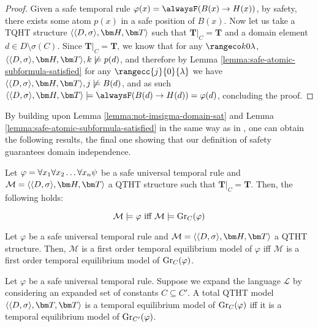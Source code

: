 \begin{proof}
  Given a safe temporal rule
  $\varphi(x) = \alwaysF(B(x) \rightarrow H(x))$, by safety, there
  exists some atom $p(x)$ in a safe position of $B(x)$. Now let us
  take a TQHT structure $\qthandt$ such that $\bm{T}\vert_{C}=\bm{T}$
  and a domain element $d \in D \setminus \sigma(C)$. Since
  $\bm{T}\vert_{C}=\bm{T}$, we know that for any $\kinlambda$,
  $\qthandt, k \not \models p(d)$, and therefore by Lemma
  \ref{lemma:safe-atomic-subformula-satisfied} for any
  $\rangecc{j}{0}{\lambda}$ we have $\qthandt,j \not \models B(d)$,
  and as such
  $\qthandt \models \alwaysF(B(d) \rightarrow H(d)) = \varphi(d)$,
  concluding the proof.
\end{proof}

By building upon Lemma \ref{lemma:not-imsigma-domain-sat} and Lemma
\ref{lemma:safe-atomic-subformula-satisfied} in the same way as in
\cite{agcapevidi17a}, one can obtain the following results, the final
one showing that our definition of safety guarantees domain independence.

\begin{proposition}\label{prop:sat-iff-sat-groundc}
  Let $\varphi = \forall x_1 \forall x_2 \dots \forall x_n \psi$ be a safe universal temporal rule and \\
  $\mathcal{M} = \qthandt$ a QTHT structure such that
  $\bm{T}\vert_{C}=\bm{T}$. Then, the following holds:

  \begin{equation*}
    \mathcal{M} \models \varphi \text{ iff } \mathcal{M} \models \operatorname{Gr}_{C}(\varphi)
  \end{equation*}
\end{proposition}

\begin{proposition}
  Let $\varphi$ be a safe universal temporal rule and
  $\mathcal{M} = \qthandt$ a QTHT structure. Then, $\mathcal{M}$ is a
  first order temporal equilibrium model of $\varphi$ iff
  $\mathcal{M}$ is a first order temporal equilibrium model of
  $\operatorname{Gr}_{C}(\varphi)$.
\end{proposition}

\begin{theorem}\label{theorem:domain-independence}
  Let $\varphi$ be a safe universal temporal rule. Suppose we expand
  the language $\mathcal{L}$ by considering an expanded set of
  constants $C \subseteq C'$. A total QTHT model $\qttandt$ is a
  temporal equilibrium model of $\operatorname{Gr}_{C}(\varphi)$ iff it is a
  temporal equilibrium model of $\operatorname{Gr}_{C'}(\varphi)$.
\end{theorem}

